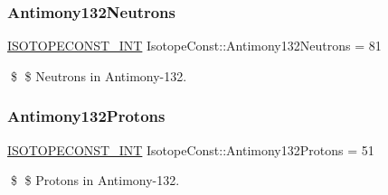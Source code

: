 \subsubsection{\texorpdfstring{Antimony132\+Neutrons}{Antimony132Neutrons}}
{\footnotesize\ttfamily \mbox{\hyperlink{group___isotope_const-_macros_ga5f18360b3e99483a35c32d789e62621c}{I\+S\+O\+T\+O\+P\+E\+C\+O\+N\+S\+T\+\_\+\+I\+NT}} Isotope\+Const\+::\+Antimony132\+Neutrons = 81}

\$ \$ Neutrons in Antimony-\/132. \mbox{\label{group___isotope_const-_antimony-_sb132_gac4f2dd27ae216951d7b4a0a6b7f3ed07}} 
\subsubsection{\texorpdfstring{Antimony132\+Protons}{Antimony132Protons}}
{\footnotesize\ttfamily \mbox{\hyperlink{group___isotope_const-_macros_ga5f18360b3e99483a35c32d789e62621c}{I\+S\+O\+T\+O\+P\+E\+C\+O\+N\+S\+T\+\_\+\+I\+NT}} Isotope\+Const\+::\+Antimony132\+Protons = 51}

\$ \$ Protons in Antimony-\/132. 